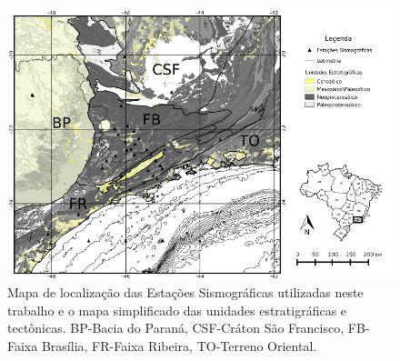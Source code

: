 \begin{figure}[!ht]
\centering
\includegraphics[scale=0.5]{Figs/mapa_estacoes_geologico.png}
\caption[Mapa de localização das Estações Sismográficas na região com o mapa geológico simplificado.]{Mapa de localização das Estações Sismográficas utilizadas neste trabalho e o mapa simplificado das unidades estratigráficas e tectônicas. BP-Bacia do Paraná, CSF-Cráton São Francisco, FB-Faixa Brasília, FR-Faixa Ribeira, TO-Terreno Oriental.}
\label{mapa_estacoes_geologico}
\end{figure}

